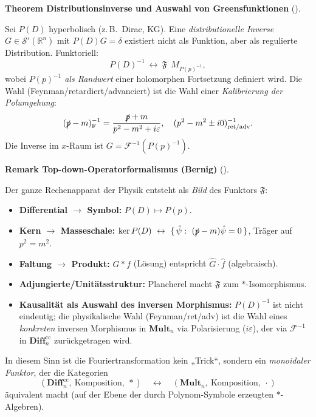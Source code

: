 \documentclass[10pt, letterpaper]{article}
\newcommand{\R}{\mathbb{R}}
\newcommand{\CustomHeading}[3]{%
  \par\medskip\noindent%
  \textbf{#1 #2} \textnormal{(#3)}.\enskip%
}
\newenvironment{THEO}[2]{\begin{unitbox}\CustomHeading{Theorem}{#1}{#2}}{\end{unitbox}}
\newenvironment{REM}[2]{\begin{unitbox}\CustomHeading{Remark}{#1}{#2}}{\end{unitbox}}
\begin{document}


\begin{THEO}{Distributionsinverse und Auswahl von Greensfunktionen}{}
Sei $P(D)$ hyperbolisch (z.\,B.\ Dirac, KG). Eine \emph{distributionelle Inverse}
$G\in\mathcal{S}'(\R^n)$ mit $P(D)G=\delta$ existiert nicht als Funktion, aber als regulierte Distribution. Funktoriell:
\[
P(D)^{-1}\ \leftrightarrow{\ \mathfrak{F}\ }\ M_{P(p)^{-1}},
\]
wobei $P(p)^{-1}$ \emph{als Randwert} einer holomorphen Fortsetzung definiert wird. Die Wahl (Feynman/retardiert/advanciert) ist die Wahl einer \emph{Kalibrierung der Polumgehung}:
\[
(\slashed{p}-m)^{-1}_{\mathrm{F}}=\frac{\slashed{p}+m}{p^2-m^2+i\varepsilon},
\quad
(p^2-m^2\pm i0)^{-1}_{\mathrm{ret/adv}}.
\]
Die Inverse im $x$-Raum ist $G=\mathcal{F}^{-1}(P(p)^{-1})$.
\end{THEO}




\begin{REM}{Top-down-Operatorformalismus (Bernig)}{}
Der ganze Rechenapparat der Physik entsteht als \emph{Bild} des Funktors $\mathfrak{F}$:
\begin{itemize}
\item \textbf{Differential $\to$ Symbol:} $P(D)\mapsto P(p)$.
\item \textbf{Kern $\to$ Masseschale:} $\ker P(D)\ \leftrightarrow\ \{\,\hat\psi:\ (\slashed{p}-m)\hat\psi=0\,\}$, Träger auf $p^2=m^2$.
\item \textbf{Faltung $\to$ Produkt:} $G*f$ (Lösung) entspricht $\widehat{G}\cdot\hat f$ (algebraisch).
\item \textbf{Adjungierte/Unitätsstruktur:} Plancherel macht $\mathfrak{F}$ zum $\ast$-Isomorphismus.
\item \textbf{Kausalität als Auswahl des inversen Morphismus:} $P(D)^{-1}$ ist nicht eindeutig; die physikalische Wahl (Feynman/ret/adv) ist die Wahl eines \emph{konkreten} inversen Morphismus in $\mathbf{Mult}_n$ via Polarisierung ($i\varepsilon$), der via $\mathcal{F}^{-1}$ in $\mathbf{Diff}^{\mathrm{cc}}_n$ zurückgetragen wird.
\end{itemize}
In diesem Sinn ist die Fouriertransformation kein „Trick“, sondern ein \emph{monoidaler Funktor}, der die Kategorien
\[
(\mathbf{Diff}^{\mathrm{cc}}_n,\ \text{Komposition},\ *)\quad\longleftrightarrow\quad
(\mathbf{Mult}_n,\ \text{Komposition},\ \cdot)
\]
äquivalent macht (auf der Ebene der durch Polynom-Symbole erzeugten $\ast$-Algebren).
\end{REM}
\end{document}
